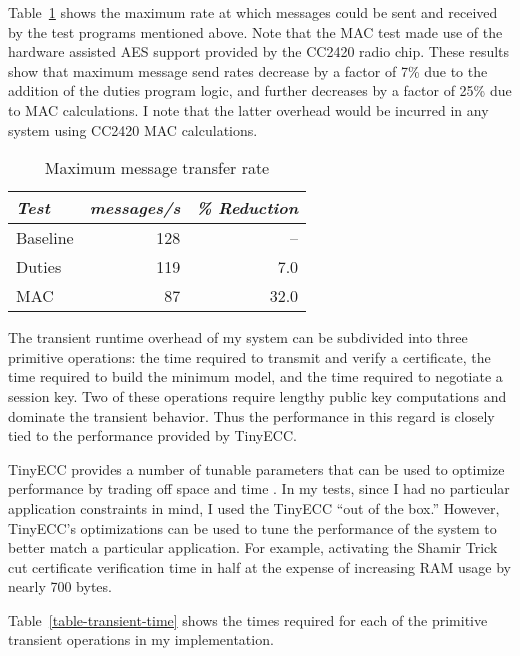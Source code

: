 Table~\ref{table-steady-state} shows the maximum rate at which messages could be sent and
received by the test programs mentioned above. Note that the MAC test made use of the hardware
assisted AES support provided by the CC2420 radio chip. These results show that maximum message
send rates decrease by a factor of 7\% due to the addition of the duties program logic, and
further decreases by a factor of 25\% due to MAC calculations. I note that the latter overhead
would be incurred in any system using CC2420 MAC calculations.

\begin{table}[!t]
  \newcommand\T{\rule{0pt}{2.1ex}}
  \centering
  \caption{Maximum message transfer rate}
  {
  \begin{tabular}{|l|r|r|} \hline
    \textit{Test} \T & \textit{messages/s} & \textit{\% Reduction} \\
    \hline \hline

    Baseline \T & 128 &   -- \\ \hline 
    Duties   \T & 119 &  7.0 \\ \hline
    MAC      \T &  87 & 32.0 \\ \hline
  \end{tabular}
  }
  \label{table-steady-state}
\end{table}

The transient runtime overhead of my system can be subdivided into three primitive operations:
the time required to transmit and verify a certificate, the time required to build the minimum
model, and the time required to negotiate a session key. Two of these operations require lengthy
public key computations and dominate the transient behavior. Thus the performance in this regard
is closely tied to the performance provided by TinyECC.

TinyECC provides a number of tunable parameters that can be used to optimize performance by
trading off space and time \cite{Liu-Peng-TinyECC-2008}. In my tests, since I had no particular
application constraints in mind, I used the TinyECC ``out of the box.'' However, TinyECC's
optimizations can be used to tune the performance of the system to better match a particular
application. For example, activating the Shamir Trick cut certificate verification time in half
at the expense of increasing RAM usage by nearly 700 bytes.

Table~\ref{table-transient-time} shows the times required for each of the primitive transient
operations in my implementation.

